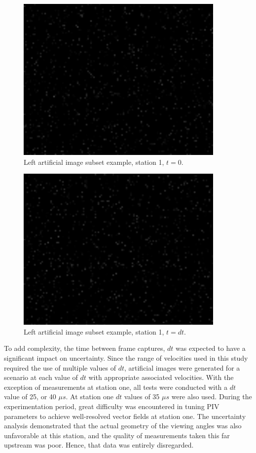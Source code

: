 \begin{figure}[H]
	\centering
	\includegraphics[width=4in]{figs/artificial_images/la}
	\caption{Left artificial image subset example, station 1, $t=0$.}
	\label{fig:la}
\end{figure}

\begin{figure}[H]
	\centering
	\includegraphics[width=4in]{figs/artificial_images/lb}
	\caption{Left artificial image subset example, station 1, $t=dt$.}
	\label{fig:lb}
\end{figure}

To add complexity, the time between frame captures, $dt$ was expected to have a 
significant impact on uncertainty. Since the range of velocities used in this 
study required the use of multiple values of $dt$, artificial images were 
generated for a scenario at each value of $dt$ with appropriate associated 
velocities. 
With the exception of measurements at station one, all tests were conducted 
with a $dt$ value of 25, or 40 $\mu s$. At station one $dt$ values of 35 $\mu 
s$ were also used. During the experimentation period, great difficulty 
was encountered in tuning PIV parameters to achieve well-resolved vector fields 
at station one. The uncertainty analysis demonstrated that the actual geometry 
of the viewing angles was also unfavorable at this station, and the quality of 
measurements taken this far upstream was poor. Hence, that data was entirely 
disregarded.

